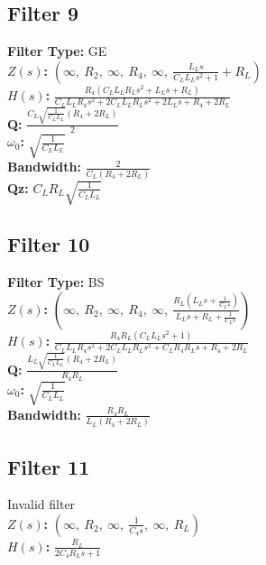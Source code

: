 \documentclass{article}
\begin{document}
\subsection*{Filter 9}
\textbf{Filter Type:} GE \\ 
\textbf{$Z(s)$:} $\left( \infty, \  R_{2}, \  \infty, \  R_{4}, \  \infty, \  \frac{L_{L} s}{C_{L} L_{L} s^{2} + 1} + R_{L}\right)$ \\ 
\textbf{$H(s)$:} $\frac{R_{4} \left(C_{L} L_{L} R_{L} s^{2} + L_{L} s + R_{L}\right)}{C_{L} L_{L} R_{4} s^{2} + 2 C_{L} L_{L} R_{L} s^{2} + 2 L_{L} s + R_{4} + 2 R_{L}}$ \\ 
\textbf{Q:} $\frac{C_{L} \sqrt{\frac{1}{C_{L} L_{L}}} \left(R_{4} + 2 R_{L}\right)}{2}$ \\ 
\textbf{$\omega_0$:} $\sqrt{\frac{1}{C_{L} L_{L}}}$ \\ 
\textbf{Bandwidth:} $\frac{2}{C_{L} \left(R_{4} + 2 R_{L}\right)}$ \\ 
\textbf{Qz:} $C_{L} R_{L} \sqrt{\frac{1}{C_{L} L_{L}}}$ \\ 
\subsection*{Filter 10}
\textbf{Filter Type:} BS \\ 
\textbf{$Z(s)$:} $\left( \infty, \  R_{2}, \  \infty, \  R_{4}, \  \infty, \  \frac{R_{L} \left(L_{L} s + \frac{1}{C_{L} s}\right)}{L_{L} s + R_{L} + \frac{1}{C_{L} s}}\right)$ \\ 
\textbf{$H(s)$:} $\frac{R_{4} R_{L} \left(C_{L} L_{L} s^{2} + 1\right)}{C_{L} L_{L} R_{4} s^{2} + 2 C_{L} L_{L} R_{L} s^{2} + C_{L} R_{4} R_{L} s + R_{4} + 2 R_{L}}$ \\ 
\textbf{Q:} $\frac{L_{L} \sqrt{\frac{1}{C_{L} L_{L}}} \left(R_{4} + 2 R_{L}\right)}{R_{4} R_{L}}$ \\ 
\textbf{$\omega_0$:} $\sqrt{\frac{1}{C_{L} L_{L}}}$ \\ 
\textbf{Bandwidth:} $\frac{R_{4} R_{L}}{L_{L} \left(R_{4} + 2 R_{L}\right)}$ \\ 
\subsection*{Filter 11}
Invalid filter \\ 
\textbf{$Z(s)$:} $\left( \infty, \  R_{2}, \  \infty, \  \frac{1}{C_{4} s}, \  \infty, \  R_{L}\right)$ \\ 
\textbf{$H(s)$:} $\frac{R_{L}}{2 C_{4} R_{L} s + 1}$ \\ 
\end{document}
